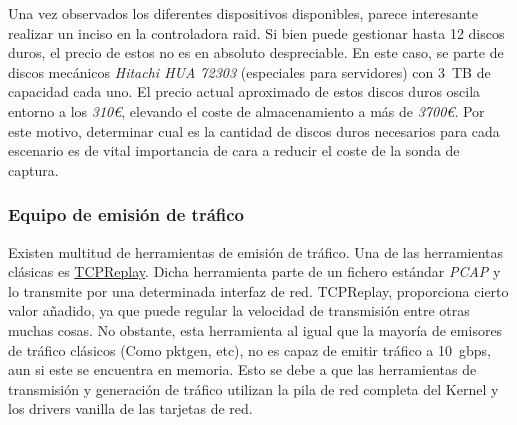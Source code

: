Una vez observados los diferentes dispositivos disponibles, parece interesante realizar un inciso en la controladora raid.
Si bien puede gestionar hasta 12 discos duros, el precio de estos no es en absoluto despreciable.
En este caso, se parte de discos mecánicos \textit{Hitachi HUA 72303} (especiales para servidores) con 3~TB de capacidad cada uno.
El precio actual aproximado de estos discos duros oscila entorno a los \textit{310€}, elevando el coste de almacenamiento a más de \textit{3700€}.
Por este motivo, determinar cual es la cantidad de discos duros necesarios para cada escenario es de vital importancia de cara a reducir el coste de la sonda de captura.


\subsubsection{Equipo de emisión de tráfico}

Existen multitud de herramientas de emisión de tráfico.
Una de las herramientas clásicas es \href{http://tcpreplay.appneta.com/}{TCPReplay}.
Dicha herramienta parte de un fichero estándar \textit{PCAP} y lo transmite por una determinada interfaz de red. TCPReplay, proporciona cierto valor añadido, ya que puede regular la velocidad de transmisión entre otras muchas cosas. No obstante, esta herramienta al igual que la mayoría de emisores de tráfico clásicos (Como pktgen, etc), no es capaz de emitir tráfico a 10~\gls{gbps}, aun si este se encuentra en memoria. Esto se debe a que las herramientas de transmisión y generación de tráfico utilizan la pila de red completa del Kernel y los drivers \gls{vanilla} de las tarjetas de red.

